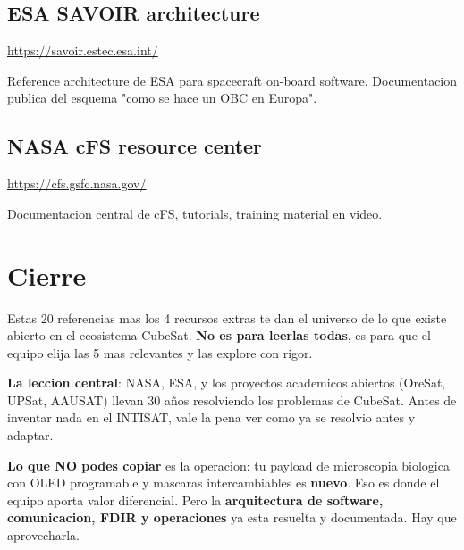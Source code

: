 \documentclass[11pt,a4paper,oneside]{report}
\begin{document}
\section{ESA SAVOIR architecture}

\url{https://savoir.estec.esa.int/}

Reference architecture de ESA para spacecraft on-board software.
Documentacion publica del esquema "como se hace un OBC en Europa".

\section{NASA cFS resource center}

\url{https://cfs.gsfc.nasa.gov/}

Documentacion central de cFS, tutorials, training material en video.

\chapter{Cierre}

Estas 20 referencias mas los 4 recursos extras te dan el universo de
lo que existe abierto en el ecosistema CubeSat. \textbf{No es para leerlas
todas}, es para que el equipo elija las 5 mas relevantes y las explore
con rigor.

\textbf{La leccion central}: NASA, ESA, y los proyectos academicos
abiertos (OreSat, UPSat, AAUSAT) llevan 30 años resolviendo los problemas
de CubeSat. Antes de inventar nada en el INTISAT, vale la pena ver como
ya se resolvio antes y adaptar.

\textbf{Lo que NO podes copiar} es la operacion: tu payload de microscopia
biologica con OLED programable y mascaras intercambiables es \textbf{nuevo}.
Eso es donde el equipo aporta valor diferencial. Pero la \textbf{arquitectura
de software, comunicacion, FDIR y operaciones} ya esta resuelta y
documentada. Hay que aprovecharla.
\end{document}
